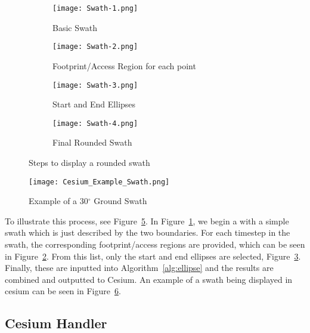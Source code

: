 \begin{description}
\begin{figure}
    \centering
    \begin{subfigure}[b]{0.45\textwidth}
	\texttt{[image: Swath-1.png]} 
	\caption{Basic Swath}
	\label{fig:swath-1}
    \end{subfigure}
    \hfill
    \begin{subfigure}[b]{0.45\textwidth}
	\texttt{[image: Swath-2.png]} 
	\caption{Footprint/Access Region for each point}
	\label{fig:swath-2}
    \end{subfigure}
    \begin{subfigure}[b]{0.45\textwidth}
	\texttt{[image: Swath-3.png]} 
	\caption{Start and End Ellipses}
	\label{fig:swath-3}
    \end{subfigure}
    \hfill
    \begin{subfigure}[b]{0.45\textwidth}
	\texttt{[image: Swath-4.png]} 
	\caption{Final Rounded Swath}
	\label{fig:swath-4}
    \end{subfigure}

    \caption{Steps to display a rounded swath}
    \label{fig:swath-steps}
\end{figure}


\begin{figure}[h]
    \centering
    \texttt{[image: Cesium\_Example\_Swath.png]} 
    \caption{Example of a 30$^\circ$ Ground Swath}
    \label{fig:cesium_swath}
\end{figure} 

To illustrate this process, see Figure~\ref{fig:swath-steps}.  In
Figure~\ref{fig:swath-1}, we begin a with a simple swath which is just
described by the two boundaries. For each timestep in the swath, the
corresponding footprint/access regions are provided, which can be seen in
Figure~\ref{fig:swath-2}.  From this list, only the start and end ellipses are
selected, Figure~\ref{fig:swath-3}. Finally, these are inputted into
Algorithm~\ref{alg:ellipse} and the results are combined and outputted to
Cesium. An example of a swath being displayed in cesium can be seen in
Figure~\ref{fig:cesium_swath}. 

\end{description}


\subsection{Cesium Handler}

